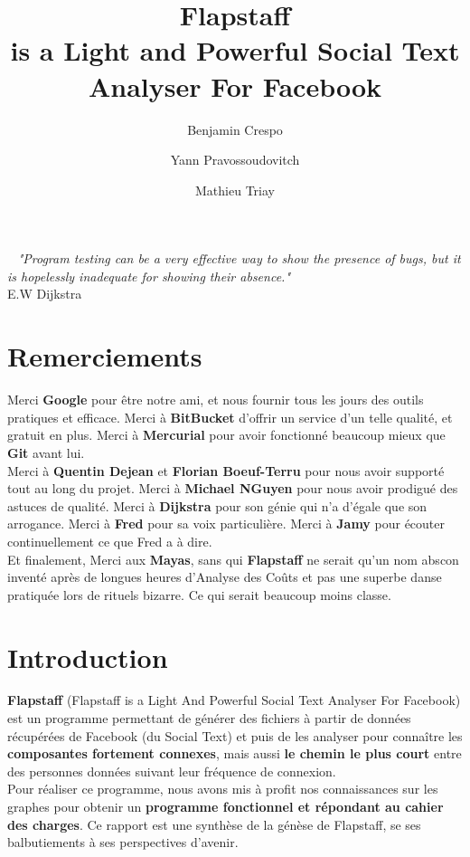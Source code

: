 \documentclass[a4paper, titlepage, oneside]{book}
\title{Flapstaff\\is a Light and Powerful Social Text Analyser For Facebook}           %
\author{Benjamin Crespo\and Yann Pravossoudovitch \and Mathieu Triay}
\begin{document}
\maketitle                

\newpage
~
\vfill
\emph{"Program testing can be a very effective way to show the presence of bugs, but it is hopelessly inadequate for showing their absence."}\\

	E.W Dijkstra
\vfill
	
\tableofcontents 

\chapter{Remerciements}

Merci \textbf{Google} pour être notre ami, et nous fournir tous les jours des outils pratiques et efficace. Merci à \textbf{BitBucket} d'offrir un service d'un telle qualité, et gratuit en plus. Merci à \textbf{Mercurial} pour avoir fonctionné beaucoup mieux que \textbf{Git} avant lui.\\

Merci à \textbf{Quentin Dejean} et \textbf{Florian Boeuf-Terru} pour nous avoir supporté tout au long du projet. Merci à \textbf{Michael NGuyen} pour nous avoir prodigué des astuces de qualité. Merci à \textbf{Dijkstra} pour son génie qui n'a d'égale que son arrogance. Merci à \textbf{Fred} pour sa voix particulière. Merci à \textbf{Jamy} pour écouter continuellement ce que Fred a à dire.\\

Et finalement, Merci aux \textbf{Mayas}, sans qui \textbf{Flapstaff} ne serait qu'un nom abscon inventé après de longues heures d'Analyse des Coûts et pas une superbe danse pratiquée lors de rituels bizarre. Ce qui serait beaucoup moins classe.

\chapter{Introduction}

\textbf{Flapstaff} (Flapstaff is a Light And Powerful Social Text Analyser For Facebook) est un programme permettant de générer des fichiers à partir de données récupérées de Facebook (du Social Text) et puis de les analyser pour connaître les \textbf{composantes fortement connexes}, mais aussi \textbf{le chemin le plus court} entre des personnes données suivant leur fréquence de connexion.\\
Pour réaliser ce programme, nous avons mis à profit nos connaissances sur les graphes pour obtenir un \textbf{programme fonctionnel et répondant au cahier des charges}. Ce rapport est une synthèse de la génèse de Flapstaff, se ses balbutiements à ses perspectives d'avenir.\\
\end{document}
